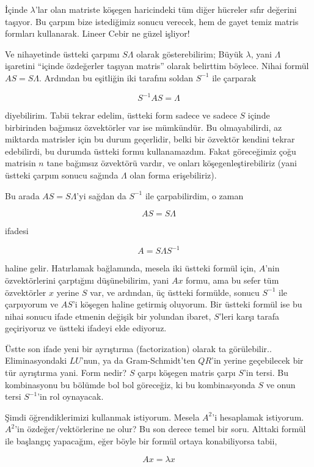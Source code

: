 \documentclass[12pt,fleqn]{article}\usepackage{../../common}
\begin{document}
İçinde $\lambda$'lar olan matriste köşegen haricindeki tüm diğer hücreler
sıfır değerini taşıyor. Bu çarpım bize istediğimiz sonucu verecek, hem de
gayet temiz matris formları kullanarak. Lineer Cebir ne güzel işliyor! 

Ve nihayetinde üstteki çarpımı $S\Lambda$ olarak gösterebilirim; Büyük
$\lambda$, yani $\Lambda$ işaretini ``içinde özdeğerler taşıyan matris''
olarak belirttim böylece. Nihai formül $AS = S\Lambda$. Ardından bu
eşitliğin iki tarafını soldan $S^{-1}$ ile çarparak

$$ S^{-1}AS = \Lambda $$

diyebilirim. Tabii tekrar edelim, üstteki form sadece ve sadece $S$ içinde
birbirinden bağımsız özvektörler var ise mümkündür. Bu olmayabilirdi, az
miktarda matrisler için bu durum geçerlidir, belki bir özvektör kendini
tekrar edebilirdi, bu durumda üstteki formu kullanamazdım. Fakat
göreceğimiz çoğu matrisin $n$ tane bağımsız özvektörü vardır, ve onları
köşegenleştirebiliriz (yani üstteki çarpım sonucu sağında $\Lambda$ olan
forma erişebiliriz).

Bu arada $AS=S\Lambda$'yi sağdan da $S^{-1}$ ile çarpabilirdim, o zaman 

$$AS=S\Lambda $$

ifadesi

$$ A = S \Lambda S^{-1} $$

haline gelir. Hatırlamak bağlamında, mesela iki üstteki formül için,
$A$'nin özvektörlerini çarptığını düşünebilirim, yani $Ax$ formu, ama bu
sefer tüm özvektörler $x$ yerine $S$ var, ve ardından, üç üstteki formülde,
sonucu $S^{-1}$ ile çarpıyorum ve $AS$'i köşegen haline getirmiş
oluyorum. Bir üstteki formül ise bu nihai sonucu ifade etmenin değişik bir
yolundan ibaret, $S$'leri karşı tarafa geçiriyoruz ve üstteki ifadeyi elde
ediyoruz.

Üstte son ifade yeni bir ayrıştırma (factorization) olarak ta
görülebilir.. Eliminasyondaki $LU$'nun, ya da Gram-Schmidt'ten $QR$'in
yerine geçebilecek bir tür ayrıştırma yani. Form nedir? $S$ çarpı köşegen
matris çarpı $S$'in tersi. Bu kombinasyonu bu bölümde bol bol göreceğiz, ki
bu kombinasyonda $S$ ve onun tersi $S^{-1}$'in rol oynayacak.

Şimdi öğrendiklerimizi kullanmak istiyorum. Mesela $A^2$'i hesaplamak
istiyorum. $A^2$'in özdeğer/vektörlerine ne olur? Bu son derece temel bir
soru. Alttaki formül ile başlangıç yapacağım, eğer böyle bir formül ortaya
konabiliyorsa tabii, 

$$ Ax = \lambda x $$
\end{document}
